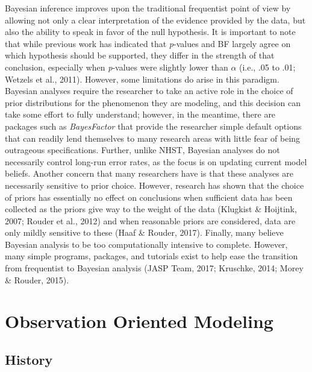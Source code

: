 \documentclass[english,mask,man]{apa6}
\theoremstyle{definition}
\theoremstyle{definition}
\theoremstyle{definition}
\theoremstyle{remark}
\begin{document}
Bayesian inference improves upon the traditional frequentist point of
view by allowing not only a clear interpretation of the evidence
provided by the data, but also the ability to speak in favor of the null
hypothesis. It is important to note that while previous work has
indicated that \emph{p}-values and BF largely agree on which hypothesis
should be supported, they differ in the strength of that conclusion,
especially when \emph{p}-values were slightly lower than \(\alpha\)
(i.e., .05 to .01; Wetzels et al., 2011). However, some limitations do
arise in this paradigm. Bayesian analyses require the researcher to take
an active role in the choice of prior distributions for the phenomenon
they are modeling, and this decision can take some effort to fully
understand; however, in the meantime, there are packages such as
\emph{BayesFactor} that provide the researcher simple default options
that can readily lend themselves to many research areas with little fear
of being outrageous specifications. Further, unlike NHST, Bayesian
analyses do not necessarily control long-run error rates, as the focus
is on updating current model beliefs. Another concern that many
researchers have is that these analyses are necessarily sensitive to
prior choice. However, research has shown that the choice of priors has
essentially no effect on conclusions when sufficient data has been
collected as the priors give way to the weight of the data (Klugkist \&
Hoijtink, 2007; Rouder et al., 2012) and when reasonable priors are
considered, data are only mildly sensitive to these (Haaf \& Rouder,
2017). Finally, many believe Bayesian analysis to be too computationally
intensive to complete. However, many simple programs, packages, and
tutorials exist to help ease the transition from frequentist to Bayesian
analysis (JASP Team, 2017; Kruschke, 2014; Morey \& Rouder, 2015).

\section{Observation Oriented
Modeling}\label{observation-oriented-modeling}

\subsection{History}\label{history-2}
\end{document}
